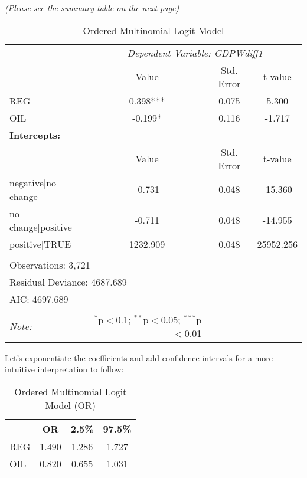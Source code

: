 \documentclass[12pt,letterpaper]{article}
\begin{document}
\begin{enumerate}
	 

 \vspace{3cm}
\begin{center}
		\textit{	(Please see the summary table on the next page)}
\end{center}

	\begin{table}[H] 
\centering 
\caption{Ordered Multinomial Logit Model} 
\label{} 
\begin{tabular}{lccc} 
\hline 
\hline 
& \multicolumn{3}{c}{\textit{Dependent Variable: GDPWdiff1}} \\
\cline{2-4} 
& Value & Std. Error & t-value \\ 
\hline 
REG & 0.398*** & 0.075 & 5.300 \\ 
OIL & -0.199* & 0.116 & -1.717 \\ 
\hline 
\multicolumn{4}{l}{\textbf{Intercepts:}} \\
\hline 
& Value & Std. Error & t-value \\ 
\hline 
negative|no change & -0.731 & 0.048 & -15.360 \\
no change|positive & -0.711 & 0.048 & -14.955 \\
positive|TRUE & 1232.909 & 0.048 & 25952.256 \\

\hline \\[-1.8ex] 
\multicolumn{4}{l}{Observations: 3,721}  \\ 
\multicolumn{4}{l}{Residual Deviance: 4687.689} \\
\multicolumn{4}{l}{AIC: 4697.689} \\
\hline 
\hline \\[-1.8ex] 
\textit{Note:}  & \multicolumn{1}{r}{$^{*}$p$<$0.1; $^{**}$p$<$0.05; $^{***}$p$<$0.01} \\ 
\hline 
\end{tabular} 
\end{table}


		Let's exponentiate the coefficients and add confidence intervals for a more intuitive interpretation to follow: 
	
	 
	
	
	\begin{table}[H] 
\centering 
\caption{Ordered Multinomial Logit Model (OR)} 
\begin{tabular}{lccc} 
\hline 
& OR & 2.5\% & 97.5\% \\ 
\hline 
REG & 1.490 & 1.286 & 1.727 \\ 
OIL & 0.820 & 0.655 & 1.031 \\ 
\hline 
\end{tabular} 
\end{table}
\end{enumerate}
\end{document}
